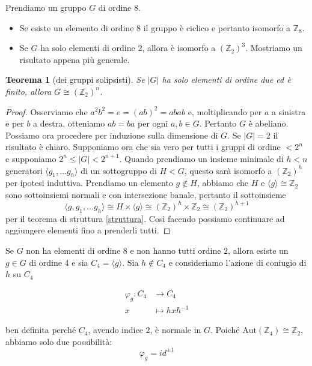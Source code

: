 \documentclass[a4paper]{article}
\newtheorem{theorem}{Teorema}[section]
\theoremstyle{remark}
\theoremstyle{definition}
\newcommand{\Aut}[1]{\mathrm{Aut}\left( #1 \right)}
\newcommand{\fun}[5]{
	\begin{align*}
	#1 \colon #2 &\to #3 \\
	#4 &\mapsto #5
	\end{align*}
}
\begin{document}
\begin{multicols}{2}
	Prendiamo un gruppo $ G $ di ordine 8.
\begin{itemize}
	\item Se esiste un elemento di ordine 8 il gruppo è ciclico e pertanto isomorfo a $ \mathbb{Z}_8 $.
	\item Se $ G $ ha solo elementi di ordine 2, allora è isomorfo a $ \left(\mathbb{Z}_2\right)^3 $. Mostriamo un risultato appena più generale. 
\end{itemize}
\begin{theorem}[dei gruppi solipsisti]
	Se $ |G| $ ha solo elementi di ordine due ed è finito, allora $ G \cong \left(\mathbb{Z}_2\right)^n $.
\end{theorem}
\begin{proof}
	Osserviamo che $ a^2b^2 = e = (ab)^2 = abab $ e, moltiplicando per $ a $ a sinistra e per $ b $ a destra, otteniamo $ ab = ba $ per ogni $ a, b \in G $. Pertanto $ G $ è abeliano. Possiamo ora procedere per induzione sulla dimensione di $ G $. Se $ |G| = 2 $ il risultato è chiaro. Supponiamo ora che sia vero per tutti i gruppi di ordine $ < 2^n $ e supponiamo $ 2^ n \leq |G| < 2^{n+1} $. Quando prendiamo un insieme minimale di $ h < n $ generatori $ \langle g_1, \dots g_h \rangle $ di un sottogruppo di $ H < G $, questo sarà isomorfo a $ \left(\mathbb{Z}_2\right)^h $ per ipotesi induttiva. Prendiamo un elemento $ g \notin H$, abbiamo che $ H $ e $ \langle g \rangle \cong \mathbb{Z}_2 $ sono sottoinsiemi normali e con intersezione banale, pertanto il sottoinsieme \[ \langle g, g_1, \dots g_h \rangle \cong H \times\langle g \rangle \cong \left(\mathbb{Z}_2\right)^h \times \mathbb{Z}_2 \cong \left(\mathbb{Z}_2\right)^{h+1} \]
	per il teorema di struttura \ref{struttura}.
	Così facendo possiamo continuare ad aggiungere elementi fino a prenderli tutti.
\end{proof}
Se $ G $ non ha elementi di ordine $ 8 $ e non hanno tutti ordine $ 2 $, allora esiste un $ g \in G $ di ordine 4 e sia $ C_4 = \langle g \rangle $. Sia $ h \notin C_4 $ e consideriamo l'azione di coniugio di $ h $ su $ C_4 $
\fun{\varphi_g}{C_4}{C_4}{x}{hxh^{-1}}
ben definita perché $ C_4 $, avendo indice $ 2 $, è normale in $ G $. Poiché $ \Aut{\mathbb{Z}_4} \cong \mathbb{Z}_2 $, abbiamo solo due possibilità: $$  \varphi_g =  id^{\pm 1}  $$


\end{multicols}
\end{document}
